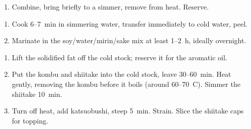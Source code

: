
\begin{ingredients}
\end{ingredients}

\begin{recipe}
  \begin{enumerate}

  \item Combine, bring briefly to a simmer, remove from heat.
    Reserve.

  \end{enumerate}
\end{recipe}



\begin{ingredients}
\end{ingredients}

\begin{recipe}
  \begin{enumerate}

  \item Cook 6\fracH--7~min in simmering water, transfer
    immediately to cold water, peel.

  \item Marinate in the soy/water/mirin/sake mix at least 1--2~h,
    ideally overnight.

  \end{enumerate}
\end{recipe}



\begin{ingredients}
\end{ingredients}

\begin{recipe}
  \begin{enumerate}

  \item Lift the solidified fat off the cold stock; reserve it for
    the aromatic oil.

  \item Put the kombu and shiitake into the cold stock, leave
    30--60~min. Heat gently, removing the kombu before it boils
    (around 60--70~\textdegree{}C). Simmer the shiitake 10~min.

  \item Turn off heat, add katsuobushi, steep 5~min. Strain. Slice
    the shiitake caps for topping.

  \end{enumerate}
\end{recipe}


